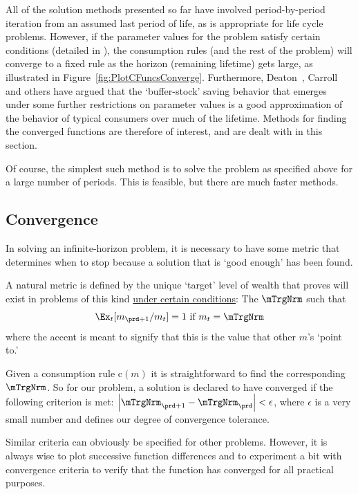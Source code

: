 \documentclass[titlepage, headings=optiontotocandhead]{econtex}
\begin{document}
All of the solution methods presented so far have involved period-by-period iteration from an assumed last period of life, as is appropriate for life cycle problems.  However, if the parameter values for the problem satisfy certain conditions (detailed in \cite{BufferStockTheory}), the consumption rules (and the rest of the problem) will converge to a fixed rule as the horizon (remaining lifetime) gets large, as illustrated in Figure~\ref{fig:PlotCFuncsConverge}.  Furthermore, Deaton~\citeyearpar{deatonLiqConstr}, Carroll~\citeyearpar{carroll:brookings,carrollBSLCPIH} and others have argued that the `buffer-stock' saving behavior that emerges under some further restrictions on parameter values is a good approximation of the behavior of typical consumers over much of the lifetime.  Methods for finding the converged functions are therefore of interest, and are dealt with in this section.

Of course, the simplest such method is to solve the problem as
specified above for a large number of periods.  This is feasible, but
there are much faster methods.

\hypertarget{convergence}{}
\subsection{Convergence}\label{subsec:convergence}

In solving an infinite-horizon problem, it is necessary to have some
metric that determines when to stop because a solution that is `good
enough' has been found.

A natural metric is defined by the unique `target' level of wealth that \cite{BufferStockTheory} proves
will exist in problems of this kind \href{https://llorracc.github.io/BufferStockTheory#GICNrm}{under certain conditions}: The $\mTrgNrm$ such that
\begin{equation}
  \Ex_t [{m}_{\prd+1}/m_t] = 1 \mbox{~if~} m_t = \mTrgNrm  \label{eq:mTrgNrmet}
\end{equation}
where the accent is meant to signify that this is the value
that other $m$'s `point to.'

Given a consumption rule $\mathrm{c}(m)$ it is straightforward to find
the corresponding $\mTrgNrm$.  So for our problem, a solution is declared
to have converged if the following criterion is met:
$\left|\mTrgNrm_{\prd+1}-\mTrgNrm_{\prd}\right| < \epsilon$, where $\epsilon$ is
a very small number and defines our degree of convergence tolerance.

Similar criteria can obviously be specified for other problems.
However, it is always wise to plot successive function differences and
to experiment a bit with convergence criteria to verify that the
function has converged for all practical purposes.
\end{document}
